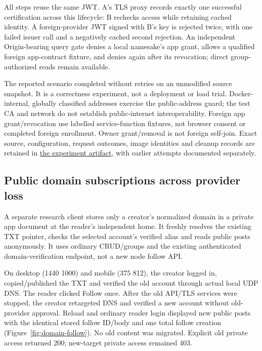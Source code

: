 \documentclass[sigconf, nonacm]{acmart}
\newcommand{\artifactbase}{https://github.com/jacoby149/web10}
\newcommand{\domainartifactrev}{26720acba859c7eb03fc5d26a6221cdde5b764a1}
\newcommand{\domainartifactdir}[2]{\href{\artifactbase/tree/\domainartifactrev/#1}{#2}}
\begin{document}
All steps reuse the same JWT. A's TLS proxy records exactly one successful
certification across this lifecycle: B rechecks access while retaining cached
identity. A foreign-provider JWT signed with B's key is rejected twice, with
one failed issuer call and a negatively cached second rejection. An independent
Origin-bearing query gate denies a local namesake's app grant, allows a
qualified foreign app-contract fixture, and denies again after its revocation;
direct group-authorized reads remain available.

The reported scenario completed without retries on an unmodified source
snapshot. It is a correctness experiment, not a deployment or load trial.
Docker-internal, globally classified addresses exercise the public-address
guard; the test CA and network do not establish public-internet interoperability.
Foreign app grant/revocation use labelled service-function fixtures, not browser
consent or completed foreign enrollment. Owner grant/removal is not foreign
self-join. Exact source, configuration, request outcomes, image identities and
cleanup records are retained in
\domainartifactdir{research/federation-demo}{the experiment artifact}, with
earlier attempts documented separately.

\subsection{Public domain subscriptions across provider loss}
\label{sec:domain-results}

A separate research client stores only a creator's normalized domain in a
private app document at the reader's independent home. It freshly resolves the
existing TXT pointer, checks the selected account's verified alias and reads
public posts anonymously. It uses ordinary CRUD/groups and the existing
authenticated domain-verification endpoint, not a new node follow API.

On desktop (1440\,\texttimes\,1000) and mobile (375\,\texttimes\,812), the creator
logged in, copied/published the TXT and verified the old account through actual
local UDP DNS. The reader clicked Follow once. After the old API/TLS services
were stopped, the creator retargeted DNS and verified a new account without
old-provider approval. Reload and ordinary reader login displayed new public
posts with the identical stored follow ID/body and one total follow creation
(Figure~\ref{fig:domain-follow}). No old content was migrated. Explicit old
private access returned 200; new-target private access remained 403.
\end{document}
